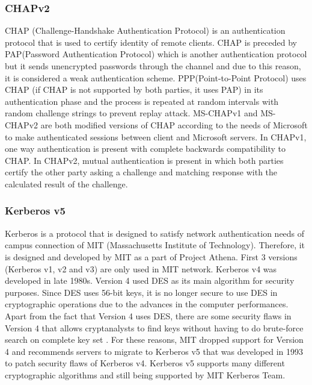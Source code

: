 \documentclass[a4paper, 12pt, titlepage]{article}
\begin{document}
\subsubsection{CHAPv2}
CHAP (Challenge-Handshake Authentication Protocol) is an authentication protocol that is used to certify identity of remote clients. CHAP is preceded by PAP(Password Authentication Protocol) which is another authentication protocol but it sends unencrypted passwords through the channel and due to this reason, it is considered a weak authentication scheme. PPP(Point-to-Point Protocol) uses CHAP (if CHAP is not supported by both parties, it uses PAP) in its authentication phase and the process is repeated at random intervals with random challenge strings to prevent replay attack. MS-CHAPv1 and MS-CHAPv2 are both modified versions of CHAP according to the needs of Microsoft to make authenticated sessions between client and Microsoft servers. In CHAPv1, one way authentication is present with complete backwards compatibility to CHAP. In CHAPv2, mutual authentication is present in which both parties certify the other party asking a challenge and matching response with the calculated result of the challenge\cite{chaprfc}.
\subsubsection{Kerberos v5}
Kerberos is a protocol that is designed to satisfy network authentication needs of campus connection of MIT (Massachusetts Institute of Technology). Therefore, it is designed and developed by MIT as a part of Project Athena. First 3 versions (Kerberos v1, v2 and v3) are only used in MIT network. Kerberos v4 was developed in late 1980s. Version 4 used DES as its main algorithm for security purposes. Since DES uses 56-bit keys, it is no longer secure to use DES in cryptographic operations due to the advances in the computer performances. Apart from the fact that Version 4 uses DES, there are some security flaws in Version 4 that allows cryptanalysts to find keys without having to do brute-force search on complete key set \cite{kerb4end}. For these reasons, MIT dropped support for Version 4 and recommends servers to migrate to Kerberos v5 that was developed in 1993 to patch security flaws of Kerberos v4. Kerberos v5 supports many different cryptographic algorithms and still being supported by MIT Kerberos Team.
\end{document}
